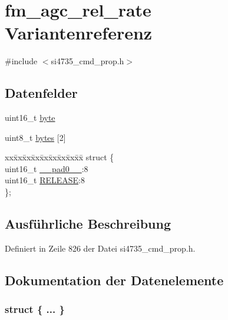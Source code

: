 \hypertarget{unionfm__agc__rel__rate}{}\section{fm\+\_\+agc\+\_\+rel\+\_\+rate Variantenreferenz}
\label{unionfm__agc__rel__rate}


{\ttfamily \#include $<$si4735\+\_\+cmd\+\_\+prop.\+h$>$}

\subsection*{Datenfelder}
\begin{DoxyCompactItemize}
\item 
uint16\+\_\+t \hyperlink{unionfm__agc__rel__rate_ab0549c1b5ea980a02e7eab77e21fea49}{byte}
\item 
uint8\+\_\+t \hyperlink{unionfm__agc__rel__rate_a46e4c05d20a047ec169f60d3167e912e}{bytes} \mbox{[}2\mbox{]}
\item 
\begin{tabbing}
xx\=xx\=xx\=xx\=xx\=xx\=xx\=xx\=xx\=\kill
struct \{\\
\>uint16\_t \hyperlink{unionfm__agc__rel__rate_a77132c2c26a75f5b8751b235cda23828}{\_\_pad0\_\_}:8\\
\>uint16\_t \hyperlink{unionfm__agc__rel__rate_a11e93d50103a9c890a961d4571dae3b9}{RELEASE}:8\\
\}; \\

\end{tabbing}\end{DoxyCompactItemize}


\subsection{Ausführliche Beschreibung}


Definiert in Zeile 826 der Datei si4735\+\_\+cmd\+\_\+prop.\+h.



\subsection{Dokumentation der Datenelemente}
\hypertarget{unionfm__agc__rel__rate_ac4a68671271d2e752a525f68c2a58513}{}\subsubsection[{"@101}]{\setlength{\rightskip}{0pt plus 5cm}struct \{ ... \} }\label{unionfm__agc__rel__rate_ac4a68671271d2e752a525f68c2a58513}
\hypertarget{unionfm__agc__rel__rate_a77132c2c26a75f5b8751b235cda23828}{}
